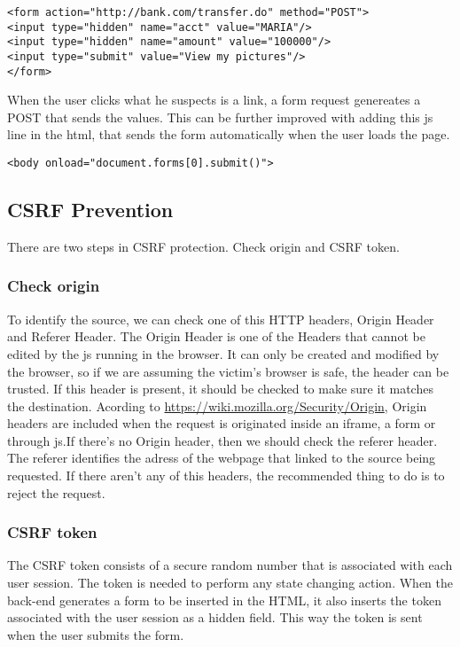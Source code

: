 \begin{lstlisting}[style=verbs]
<form action="http://bank.com/transfer.do" method="POST">
<input type="hidden" name="acct" value="MARIA"/>
<input type="hidden" name="amount" value="100000"/>
<input type="submit" value="View my pictures"/>
</form>
\end{lstlisting}
When the user clicks what he suspects is a link, a form request genereates a POST that sends the values. This can be further improved with adding this js line in the html, that sends the form automatically when the user loads the page.

\begin{lstlisting}[style=verbs]
<body onload="document.forms[0].submit()">
\end{lstlisting}

\subsection{CSRF Prevention}
There are two steps in CSRF protection. Check origin and CSRF token.
\subsubsection{Check origin}
To identify the source, we can check one of this HTTP headers, Origin Header and Referer Header.
The Origin Header is one of the Headers that cannot be edited by the js running in the browser. It can only be created and modified by the browser, so if we are assuming the victim's browser is safe, the header can be trusted. If this header is present, it should be checked to make sure it matches the destination. Acording to \url{https://wiki.mozilla.org/Security/Origin}, Origin headers are included when the request is originated inside an iframe, a form or through js.If there's no Origin header, then we should check the referer header. The referer identifies the adress of the webpage that linked to the source being requested. If there aren't any of this headers, the recommended thing to do is to reject the request.
\subsubsection{CSRF token}
The CSRF token consists of a secure random number that is associated with each user session. The token is needed to perform any state changing action. When the back-end generates a form to be inserted in the HTML, it also inserts the token associated with the user session as a hidden field. This way the token is sent when the user submits the form. 

